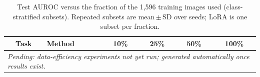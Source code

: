 \begin{table}[t]
\centering
\scriptsize
\caption{Test AUROC versus the fraction of the 1{,}596 training images used (class-stratified subsets). Repeated subsets are mean\,$\pm$\,SD over seeds; LoRA is one subset per fraction.}
\label{tab:efficiency}
\begin{tabular}{clcccc}
\toprule
Task & Method & 10\% & 25\% & 50\% & 100\%\\
\midrule
\multicolumn{6}{l}{\textit{Pending: data-efficiency experiments not yet run; generated automatically once results exist.}}\\
\bottomrule
\end{tabular}
\end{table}
